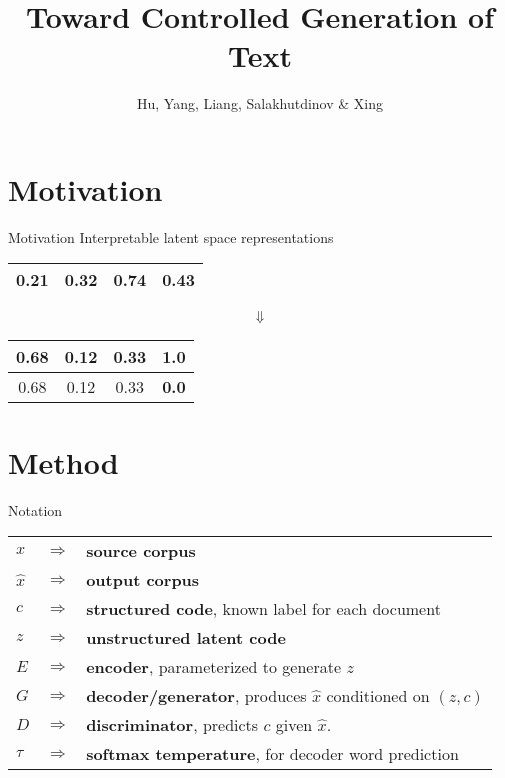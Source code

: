 \documentclass{beamer}
\title{Toward Controlled Generation of Text}
\date{}
\author{Hu, Yang, Liang, Salakhutdinov \& Xing}
\institute{ICML 2017}
\begin{document}
\maketitle

\section{Motivation}
\begin{frame}{Motivation}
  Interpretable latent space representations
  \begin{center}
    \begin{tabular}{ | c | c | c | c | }
      \hline
      0.21 & 0.32 & 0.74 & 0.43 \\  
      \hline
    \end{tabular}
    {\Huge$$\Downarrow$$}
    \begin{tabular}{ | c | c | c | c | }
      \hline
      0.68 & 0.12 & 0.33 & {\color{red}\textbf{1.0}} \\  
      \hline
      \hline
      0.68 & 0.12 & 0.33 & {\color{red}\textbf{0.0}} \\  
      \hline
    \end{tabular}
  \end{center}
\end{frame}

\section{Method}
\begin{frame}{Notation}
  \large
  \begin{tabular}{ l c l } 
    $x$ & $\Rightarrow$ & \textbf{source corpus} \\
    $\hat{x}$ & $\Rightarrow$ & \textbf{output corpus} \\
    $c$ & $\Rightarrow$ & \textbf{structured code}, known label for each document \\
    $z$ & $\Rightarrow$ & \textbf{unstructured latent code} \\
    $E$ & $\Rightarrow$ & \textbf{encoder}, parameterized to generate $z$  \\
    $G$ & $\Rightarrow$ & \textbf{decoder/generator}, produces $\hat{x}$ conditioned on $(z, c)$ \\
    $D$ & $\Rightarrow$ & \textbf{discriminator}, predicts $c$ given $\hat{x}$. \\
    $\tau$ & $\Rightarrow$ & \textbf{softmax temperature}, for decoder word prediction \\
  \end{tabular}
\end{frame}
\end{document}
